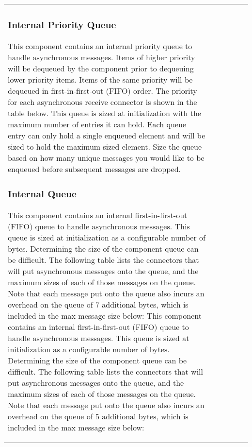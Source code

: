 \begin{xltabular}{\textwidth}{ | X | c | X | X | c | c | }
\subsubsection{Internal Priority Queue}
This component contains an internal priority queue to handle asynchronous messages. Items of higher priority will be dequeued by the component prior to dequeuing lower priority items. Items of the same priority will be dequeued in first-in-first-out (FIFO) order. The priority for each asynchronous receive connector is shown in the table below. This queue is sized at initialization with the maximum number of entries it can hold. Each queue entry can only hold a single enqueued element and will be sized to hold the maximum sized element. Size the queue based on how many unique messages you would like to be enqueued before subsequent messages are dropped.
\subsubsection{Internal Queue}
This component contains an internal first-in-first-out (FIFO) queue to handle asynchronous messages. This queue is sized at initialization as a configurable number of bytes. Determining the size of the component queue can be difficult. The following table lists the connectors that will put asynchronous messages onto the queue, and the maximum sizes of each of those messages on the queue. Note that each message put onto the queue also incurs an overhead on the queue of 7 additional bytes, which is included in the max message size below:
This component contains an internal first-in-first-out (FIFO) queue to handle asynchronous messages. This queue is sized at initialization as a configurable number of bytes. Determining the size of the component queue can be difficult. The following table lists the connectors that will put asynchronous messages onto the queue, and the maximum sizes of each of those messages on the queue. Note that each message put onto the queue also incurs an overhead on the queue of 5 additional bytes, which is included in the max message size below:


\end{xltabular}
